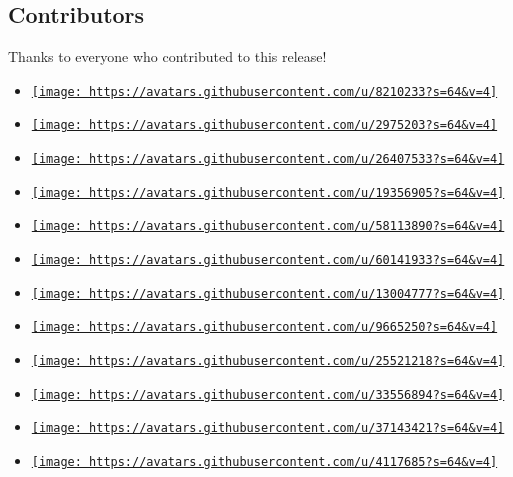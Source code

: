 \subsection{Contributors}\label{contributors}

Thanks to everyone who contributed to this release!

\begin{itemize}
\tightlist
\item
  \href{https://github.com/Beiri22}{\texttt{[image: https://avatars.githubusercontent.com/u/8210233?s=64\&v=4]}}
\item
  \href{https://github.com/bluebear94}{\texttt{[image: https://avatars.githubusercontent.com/u/2975203?s=64\&v=4]}}
\item
  \href{https://github.com/jimvdl}{\texttt{[image: https://avatars.githubusercontent.com/u/26407533?s=64\&v=4]}}
\item
  \href{https://github.com/LuxxxLucy}{\texttt{[image: https://avatars.githubusercontent.com/u/19356905?s=64\&v=4]}}
\item
  \href{https://github.com/mattfbacon}{\texttt{[image: https://avatars.githubusercontent.com/u/58113890?s=64\&v=4]}}
\item
  \href{https://github.com/sitandr}{\texttt{[image: https://avatars.githubusercontent.com/u/60141933?s=64\&v=4]}}
\item
  \href{https://github.com/xkevio}{\texttt{[image: https://avatars.githubusercontent.com/u/13004777?s=64\&v=4]}}
\item
  \href{https://github.com/Dherse}{\texttt{[image: https://avatars.githubusercontent.com/u/9665250?s=64\&v=4]}}
\item
  \href{https://github.com/Enter-tainer}{\texttt{[image: https://avatars.githubusercontent.com/u/25521218?s=64\&v=4]}}
\item
  \href{https://github.com/SimonRask}{\texttt{[image: https://avatars.githubusercontent.com/u/33556894?s=64\&v=4]}}
\item
  \href{https://github.com/Andrew15-5}{\texttt{[image: https://avatars.githubusercontent.com/u/37143421?s=64\&v=4]}}
\item
  \href{https://github.com/KillTheMule}{\texttt{[image: https://avatars.githubusercontent.com/u/4117685?s=64\&v=4]}}

\end{itemize}

